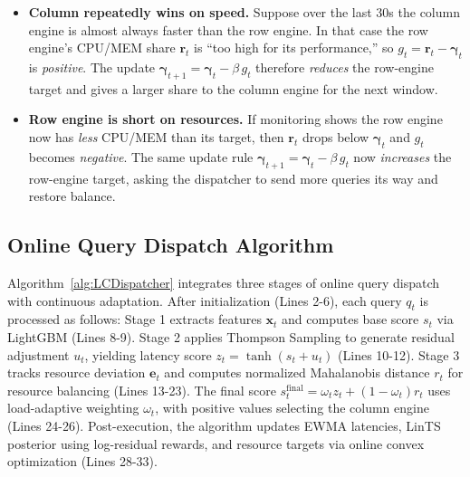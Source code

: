 \documentclass[sigconf, nonacm]{acmart}
\begin{document}
\begin{itemize}[leftmargin=*]
  \item \textbf{Column repeatedly wins on speed.}  
        Suppose over the last 30s the column engine is almost always
        faster than the row engine.  
        In that case the row engine’s CPU/MEM share
        $\mathbf r_t$ is “too high for its performance,” so  
        $g_t = \mathbf r_t-\boldsymbol\gamma_t$ is \emph{positive}.  
        The update
        $\boldsymbol\gamma_{t+1}
          = \boldsymbol\gamma_t - \beta\,g_t$
        therefore \emph{reduces} the row-engine target and gives a
        larger share to the column engine for the next window.

  \item \textbf{Row engine is short on resources.}  
        If monitoring shows the row engine now has \emph{less} CPU/MEM
        than its target, then
        $\mathbf r_t$ drops below $\boldsymbol\gamma_t$
        and $g_t$ becomes \emph{negative}.  
        The same update rule
        $\boldsymbol\gamma_{t+1}
           = \boldsymbol\gamma_t - \beta\,g_t$
        now \emph{increases} the row-engine target, asking the
        dispatcher to send more queries its way and restore balance.
\end{itemize}


\subsection{Online Query Dispatch Algorithm}
Algorithm~\ref{alg:LCDispatcher} integrates three stages of online query dispatch with continuous adaptation. After initialization (Lines 2-6), each query $q_t$ is processed as follows: Stage 1 extracts features $\mathbf{x}_t$ and computes base score $s_t$ via LightGBM (Lines 8-9). Stage 2 applies Thompson Sampling to generate residual adjustment $u_t$, yielding latency score $z_t = \tanh(s_t + u_t)$ (Lines 10-12). Stage 3 tracks resource deviation $\mathbf{e}_t$ and computes normalized Mahalanobis distance $r_t$ for resource balancing (Lines 13-23). The final score $s_t^{\text{final}} = \omega_t z_t + (1-\omega_t) r_t$ uses load-adaptive weighting $\omega_t$, with positive values selecting the column engine (Lines 24-26). Post-execution, the algorithm updates EWMA latencies, LinTS posterior using log-residual rewards, and resource targets via online convex optimization (Lines 28-33).
\end{document}

